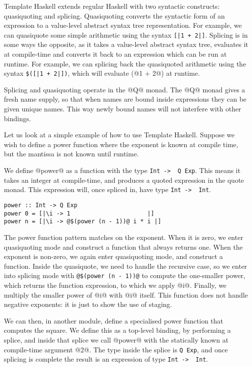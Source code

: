 Template Haskell extends regular Haskell with two syntactic constructs: quasiquoting and splicing.
Quasiquoting converts the syntactic form of an expression to a value-level abstract syntax tree representation.
For example, we can quasiquote some simple arithmetic using the syntax \lstinline/[|1 + 2|]/.
Splicing is in some ways the opposite, as it takes a value-level abstract syntax tree, evaluates it at compile-time and converts it back to an expression which can be run at runtime.
For example, we can splicing back the quasiquoted arithmetic using the syntax \lstinline/$([|1 + 2|])/, which will evaluate (@1 + 2@) at runtime.

Splicing and quasiquoting operate in the @Q@ monad.
The @Q@ monad gives a fresh name supply, so that when names are bound inside expressions they can be given unique names.
This way newly bound names will not interfere with other bindings.

Let us look at a simple example of how to use Template Haskell.
Suppose we wish to define a power function where the exponent is known at compile time, but the mantissa is not known until runtime.

We define @power@ as a function with the type \lstinline/Int ->  Q Exp/.
This means it takes an integer at compile-time, and produces a quoted expression in the quote monad.
This expression will, once spliced in, have type \lstinline/Int ->  Int/.

\begin{lstlisting}
power :: Int -> Q Exp
power 0 = [|\i -> 1                      |]
power n = [|\i -> @$(power (n - 1))@ i * i |]
\end{lstlisting}

The power function pattern matches on the exponent.
When it is zero, we enter quasiquoting mode and construct a function that always returns one.
When the exponent is non-zero, we again enter quasiquoting mode, and construct a function.
Inside the quasiquote, we need to handle the recursive case, so we enter into splicing mode with \lstinline/@$(power (n - 1))@/ to compute the one-smaller power, which returns the function expression, to which we apply @i@. Finally, we multiply the smaller power of @i@ with @i@ itself.
This function does not handle negative exponents: it is just to show the use of staging.

We can then, in another module, define a specialised power function that computes the square.
We define this as a top-level binding, by performing a splice, and inside that splice we call @power@ with the statically known at compile-time argument @2@.
The type inside the splice is \lstinline/Q Exp/, and once splicing is complete the result is an expression of type \lstinline/Int ->  Int/.

